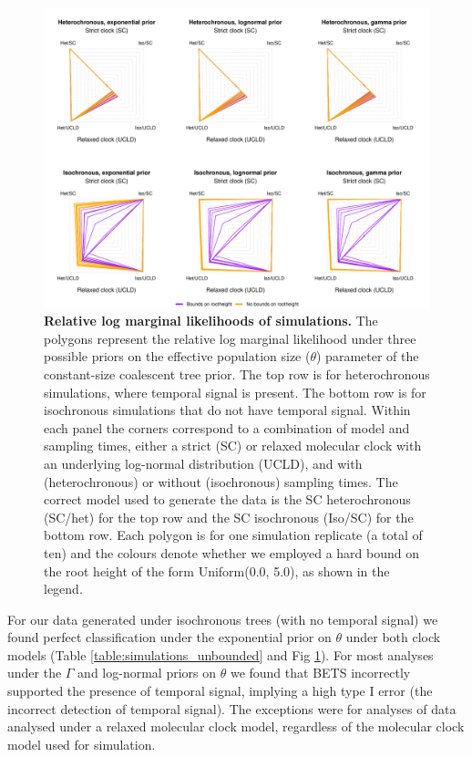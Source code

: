 \documentclass[10pt,letterpaper]{article}
\begin{document}
\begin{figure}[!h]
	\begin{center}
		\includegraphics[width=14cm]{figure_2.pdf}\newline
		\vspace{-0.3cm}
		\caption{{\textbf{Relative log marginal likelihoods of simulations.} The polygons represent the relative log marginal likelihood under three possible priors on the effective population size ($\theta$) parameter of the constant-size coalescent tree prior. The top row is for heterochronous simulations, where temporal signal is present. The bottom row is for isochronous simulations that do not have temporal signal. Within each panel the corners correspond to a combination of model and sampling times, either a strict (SC) or relaxed molecular clock with an underlying log-normal distribution (UCLD), and with (heterochronous) or without (isochronous) sampling times. The correct model used to generate the data is the SC heterochronous (SC/het) for the top row and the SC isochronous (Iso/SC) for the bottom row. Each polygon is for one simulation replicate (a total of ten) and the colours denote whether we employed a hard bound on the root height of the form Uniform(0.0, 5.0), as shown in the legend.}}
		\label{figure:SC_polygons}
	\end{center}
\end{figure}

For our data generated under isochronous trees (with no temporal signal) we found perfect classification under the exponential prior on $\theta$ under both clock models (Table \ref{table:simulations_unbounded} and Fig \ref{figure:SC_polygons}). For most analyses under the $\Gamma$ and log-normal priors on $\theta$ we found that BETS incorrectly supported the presence of temporal signal, implying a high type I error (the incorrect detection of temporal signal). The exceptions were for analyses of data analysed under a relaxed molecular clock model, regardless of the molecular clock model used for simulation. 
\end{document}
